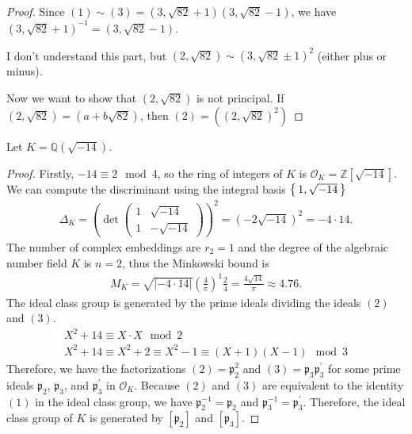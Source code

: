 \begin{proof}
    Since \((1) \sim (3) = (3, \sqrt{82} + 1) (3, \sqrt{82} - 1)\), we have \((3, \sqrt{82} + 1)^{-1} = (3, \sqrt{82} - 1)\).

    I don't understand this part, but \((2, \sqrt{82}) \sim (3, \sqrt{82} \pm 1)^2\) (either plus or minus).

    Now we want to show that \((2, \sqrt{82})\) is not principal. If \((2, \sqrt{82}) = (a + b\sqrt{82})\), then \((2) = ((2, \sqrt{82})^2)\)
\end{proof}

\begin{example}
    Let \(K = \mathbb{Q}(\sqrt{-14})\).
\end{example}

\begin{proof}
    Firstly, \(-14 \equiv 2 \mod{4}\), so the ring of integers of \(K\) is \(\mathcal{O}_K = \mathbb{Z}[\sqrt{-14}]\). We can compute the discriminant using the integral basis \(\left\{\, 1, \sqrt{-14} \,\right\}\)
    \begin{align*}
        \Delta_K = \left(\det \begin{pmatrix}
            1 & \sqrt{-14} \\
            1 & -\sqrt{-14}
        \end{pmatrix}\right)^2
        = \left(-2 \sqrt{-14}\right)^2
        = -4 \cdot 14 \text{.}
    \end{align*}
    The number of complex embeddings are \(r_2 = 1\) and the degree of the algebraic number field \(K\) is \(n = 2\), thus the Minkowski bound is
    \begin{align*}
        M_K = \sqrt{|-4 \cdot 14|} \left(\frac{4}{\pi}\right)^1 \frac{2}{4}
        = \frac{4\sqrt{14}}{\pi}
        \approx 4.76 \text{.}
    \end{align*}
    The ideal class group is generated by the prime ideals dividing the ideals \((2)\) and \((3)\).
    \begin{align*}
        X^2 + 14 \equiv X \cdot X \mod{2} \\
        X^2 + 14 \equiv X^2 + 2 \equiv X^2 - 1 \equiv (X + 1) (X - 1) \mod{3}
    \end{align*}
    Therefore, we have the factorizations \((2) = \mathfrak{p}_2^2\) and \((3) = \mathfrak{p}_3 \mathfrak{p}_3^\prime\) for some prime ideals \(\mathfrak{p}_2\), \(\mathfrak{p}_3\), and \(\mathfrak{p}_3^\prime\) in \(\mathcal{O}_K\). Because \((2)\) and \((3)\) are equivalent to the identity \((1)\) in the ideal class group, we have \(\mathfrak{p}_2^{-1} = \mathfrak{p}_2\) and \(\mathfrak{p}_3^{-1} = \mathfrak{p}_3^\prime\). Therefore, the ideal class group of \(K\) is generated by \([\mathfrak{p}_2]\) and \([\mathfrak{p}_3]\).


\end{proof}
